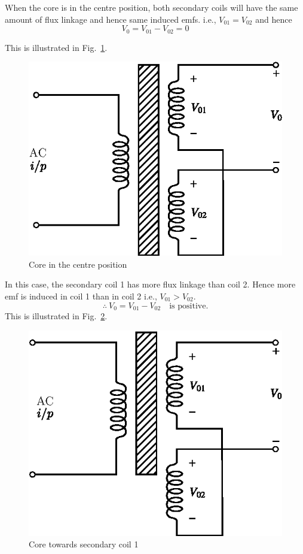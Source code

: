 \smallskip
{} 
\smallskip

When the core is in the centre position, both secondary coils will have the same amount of flux linkage and hence same induced emfs. i.e., $V_{01}=V_{02}$ and hence
$$
V_{0}=V_{01}-V_{02}=0
$$

\eject

This is illustrated in Fig.~\ref{fig8.15}.
\begin{figure}[H]
\centering
\includegraphics{chap8/fig8.15.eps}
\caption{Core in the centre position}\label{fig8.15}
\end{figure}


In this case, the secondary coil 1 has more flux linkage than coil 2. Hence more emf is induced in coil 1 than in coil 2 i.e., $V_{01}>V_{02}$.
$$
\therefore~ V_{0}=V_{01}-V_{02}\quad\text{is positive.}
$$
This is illustrated in Fig.~\ref{fig8.16}.
\begin{figure}[H]
\centering
\includegraphics{chap8/fig8.16.eps}
\caption{Core towards secondary coil 1}\label{fig8.16}
\end{figure}

